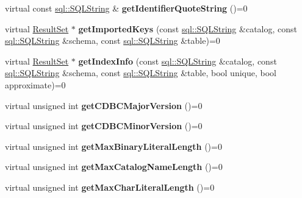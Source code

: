\begin{DoxyCompactItemize}
virtual const \hyperlink{classsql_1_1_s_q_l_string}{sql\+::\+S\+Q\+L\+String} \& {\bfseries get\+Identifier\+Quote\+String} ()=0
\item 
\hypertarget{classsql_1_1_database_meta_data_a3ac26171c59a06c53208a63168b4cf61}{}\label{classsql_1_1_database_meta_data_a3ac26171c59a06c53208a63168b4cf61} 
virtual \hyperlink{classsql_1_1_result_set}{Result\+Set} $\ast$ {\bfseries get\+Imported\+Keys} (const \hyperlink{classsql_1_1_s_q_l_string}{sql\+::\+S\+Q\+L\+String} \&catalog, const \hyperlink{classsql_1_1_s_q_l_string}{sql\+::\+S\+Q\+L\+String} \&schema, const \hyperlink{classsql_1_1_s_q_l_string}{sql\+::\+S\+Q\+L\+String} \&table)=0
\item 
\hypertarget{classsql_1_1_database_meta_data_a09f632ada5648652bf48d2a2b6896a82}{}\label{classsql_1_1_database_meta_data_a09f632ada5648652bf48d2a2b6896a82} 
virtual \hyperlink{classsql_1_1_result_set}{Result\+Set} $\ast$ {\bfseries get\+Index\+Info} (const \hyperlink{classsql_1_1_s_q_l_string}{sql\+::\+S\+Q\+L\+String} \&catalog, const \hyperlink{classsql_1_1_s_q_l_string}{sql\+::\+S\+Q\+L\+String} \&schema, const \hyperlink{classsql_1_1_s_q_l_string}{sql\+::\+S\+Q\+L\+String} \&table, bool unique, bool approximate)=0
\item 
\hypertarget{classsql_1_1_database_meta_data_a6e6846d4a1438825ceffb9f18293260a}{}\label{classsql_1_1_database_meta_data_a6e6846d4a1438825ceffb9f18293260a} 
virtual unsigned int {\bfseries get\+C\+D\+B\+C\+Major\+Version} ()=0
\item 
\hypertarget{classsql_1_1_database_meta_data_a16a975c983b124f831ec843cb50b1932}{}\label{classsql_1_1_database_meta_data_a16a975c983b124f831ec843cb50b1932} 
virtual unsigned int {\bfseries get\+C\+D\+B\+C\+Minor\+Version} ()=0
\item 
\hypertarget{classsql_1_1_database_meta_data_a397f14bc6f3b2194b0eec3e23d205bea}{}\label{classsql_1_1_database_meta_data_a397f14bc6f3b2194b0eec3e23d205bea} 
virtual unsigned int {\bfseries get\+Max\+Binary\+Literal\+Length} ()=0
\item 
\hypertarget{classsql_1_1_database_meta_data_a44cda683cedda5a2ce0bc94b93b39803}{}\label{classsql_1_1_database_meta_data_a44cda683cedda5a2ce0bc94b93b39803} 
virtual unsigned int {\bfseries get\+Max\+Catalog\+Name\+Length} ()=0
\item 
\hypertarget{classsql_1_1_database_meta_data_a82ff0807ddf8c7cf18043b12831d3af1}{}\label{classsql_1_1_database_meta_data_a82ff0807ddf8c7cf18043b12831d3af1} 
virtual unsigned int {\bfseries get\+Max\+Char\+Literal\+Length} ()=0

\end{DoxyCompactItemize}
